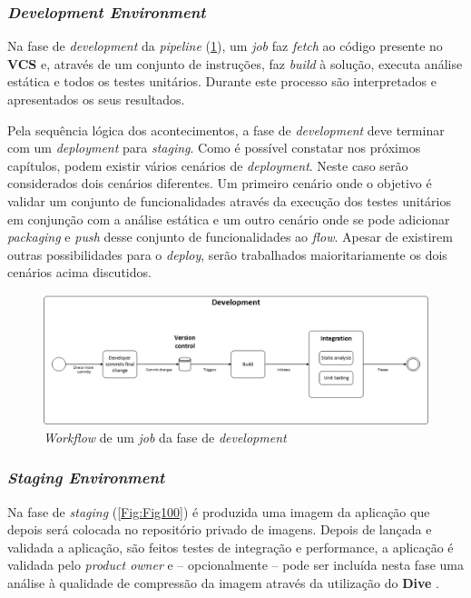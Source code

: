 \subsubsection{\textit{Development Environment}}

\hspace{1cm}Na fase de \textit{development} da \textit{pipeline} (\ref{Fig:Fig3}), um \textit{job} faz \textit{fetch} ao código presente no \textbf{VCS} e, através de um conjunto de instruções, faz \textit{build} à solução, executa análise estática e todos os testes unitários. Durante este processo são interpretados e apresentados os seus resultados.

\hspace{1cm}Pela sequência lógica dos acontecimentos, a fase de \textit{development} deve terminar com um \textit{deployment} para \textit{staging}. Como é possível constatar nos próximos capítulos, podem existir vários cenários de \textit{deployment}. Neste caso serão considerados dois cenários diferentes. Um primeiro cenário onde o objetivo é validar um conjunto de funcionalidades através da execução dos testes unitários em conjunção com a análise estática e um outro cenário onde se pode adicionar \textit{packaging} e \textit{push} desse conjunto de funcionalidades ao \textit{flow}. Apesar de existirem outras possibilidades para o \textit{deploy}, serão trabalhados maioritariamente os dois cenários acima discutidos.

\begin{figure}[hbt!]
\centering
\includegraphics[width=0.8\linewidth]{Cap2/DevelopmentStage.png}
\caption{\textit{Workflow} de um \textit{job} da fase de \textit{development}}
\label{Fig:Fig3}
\end{figure}

\subsubsection{\textit{Staging Environment}}

\hspace{1cm}Na fase de \textit{staging} (\ref{Fig:Fig100}) é produzida uma imagem da aplicação que depois será colocada no repositório privado de imagens. Depois de lançada e validada a aplicação, são feitos testes de integração e performance, a aplicação é validada pelo \textit{product owner} e -- opcionalmente -- pode ser incluída nesta fase uma análise à qualidade de compressão da imagem através da utilização do \textbf{Dive} \cite{dockerdive}.


